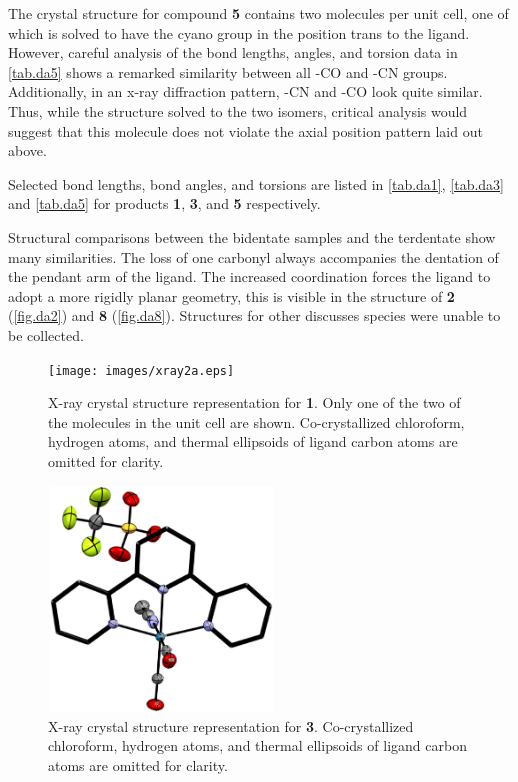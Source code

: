 The crystal structure for compound \textbf{5} contains two molecules per unit cell, one of which is solved to have the cyano group in the position trans to the ligand. However, careful analysis of the bond lengths, angles, and torsion data in \autoref{tab.da5} shows a remarked similarity between all -CO and -CN groups. Additionally, in an x-ray diffraction pattern, -CN and -CO look quite similar. Thus, while the structure solved to the two isomers, critical analysis would suggest that this molecule does not violate the axial position pattern laid out above. 

Selected bond lengths, bond angles, and torsions are listed in \autoref{tab.da1}, \autoref{tab.da3} and \autoref{tab.da5} for products \textbf{1}, \textbf{3}, and \textbf{5} respectively.






Structural comparisons between the bidentate samples and the terdentate show many similarities. The loss of one carbonyl always accompanies the dentation of the pendant arm of the ligand. The increased coordination forces the ligand to adopt a more rigidly planar geometry, this is visible in the structure of \textbf{2} (\autoref{fig.da2}) and \textbf{8} (\autoref{fig.da8}). Structures for other discusses species were unable to be collected.

\begin{figure}[!htbp]
 \begin{center}
  \texttt{[image: images/xray2a.eps]}
 \end{center}
\caption[X-ray crystal structure representation for \textbf{2}.]{X-ray crystal structure representation for \textbf{1}. Only one of the two of the molecules in the unit cell are shown. Co-crystallized chloroform, hydrogen atoms, and thermal ellipsoids of ligand carbon atoms are omitted for clarity.}
\label{fig.da2}
\end{figure}

\begin{figure}[!htbp]
 \begin{center}
  \includegraphics[clip=true, width=60mm, height=60mm, keepaspectratio]{images/xray8a.eps}
 \end{center}
\caption[X-ray crystal structure representation for \textbf{8}.]{X-ray crystal structure representation for \textbf{3}. Co-crystallized chloroform, hydrogen atoms, and thermal ellipsoids of ligand carbon atoms are omitted for clarity.}
\label{fig.da8}
\end{figure}

